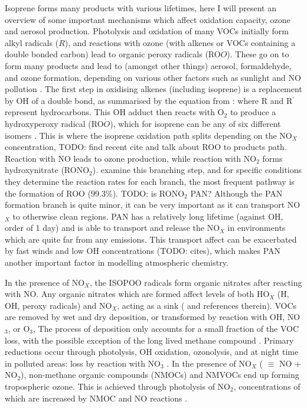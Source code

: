     Isoprene forms many products with various lifetimes, here I will present an overview of some important mechanisms which affect oxidation capacity, ozone and aerosol production.
    Photolysis and oxidation of many VOCs initially form alkyl radicals ($\dot{R}$), and reactions with ozone (with alkenes or VOCs containing a double bonded carbon) lead to organic peroxy radicals (RO$\dot{O}$). 
    These go on to form many products and lead to (amongst other things) aerosol, formaldehyde, and ozone formation, depending on various other factors such as sunlight and NO pollution \citep{Atkinson2000}.
    The first step in oxidising alkenes (including isoprene) is a replacement by OH of a double bond, as summarised by the equation from \cite{Patchen2007}:
    where R and R$^{\prime}$ represent hydrocarbons.
    This OH adduct then reacts with O$_2$ to produce a hydroxyperoxy radical (RO$\dot{O}$), which for isoprene can be any of six different isomers \citep{Patchen2007}.
    This is where the isoprene oxidation path splits depending on the NO$_X$ concentration, TODO: find recent cite and talk about ROO to products path.
    Reaction with NO leads to ozone production, while reaction with NO$_2$ forms hydroxynitrate (RONO$_2$).
    \cite{Patchen2007} examine this branching step, and for specific conditions they determine the reaction rates for each branch, the most frequent pathway is the formation of ROO (99.3\%).
    TODO: is RONO$_2$ PAN?
    Although the PAN formation branch is quite minor, it can be very important as it can transport NO$_X$ to otherwise clean regions.
    PAN has a relatively long lifetime (against OH, order of 1 day) and is able to transport and release the NO$_X$ in environments which are quite far from any emissions.
    This transport affect can be exacerbated by fast winds and low OH concentrations (TODO: cites), which makes PAN another important factor in modelling atmospheric chemistry.
    
    In the presence of NO$_X$, the ISOPOO radicals form organic nitrates after reacting with NO.
    Any organic nitrates which are formed affect levels of both HO$_X$ (H, OH, peroxy radicals) and NO$_X$, acting as a sink (\cite{Mao2013} and references therein).
    VOCs are removed by wet and dry deposition, or transformed by reaction with OH, NO$_3$, or O$_3$,
    The process of deposition only accounts for a small fraction of the VOC loss, with the possible exception of the long lived methane compound \citep{AtkinsonArey2003}.
    Primary reductions occur through photolysis, OH oxidation, ozonolysis, and at night time in polluted areas: loss by reaction with NO$_3$ \citep{AtkinsonArey2003, Brown2009}.
    In the presence of NO$_X$ ( $\equiv $ NO $+$ NO$_2$), non-methane organic compounds (NMOCs) and NMVOCs end up forming tropospheric ozone.
    This is achieved through photolysis of NO$_2$, concentrations of which are increased by NMOC and NO reactions \citep{AtkinsonArey2003}.
    

